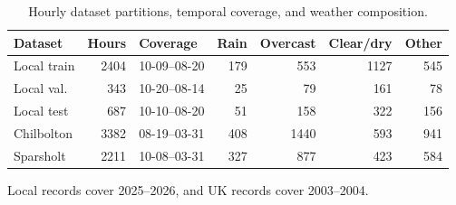 \begin{table}[!htbp]
\centering
\caption{Hourly dataset partitions, temporal coverage, and weather composition.}
\label{tab:Table02_Dataset_Overview}
\small
\setlength{\tabcolsep}{1.5pt} %
\renewcommand{\arraystretch}{1.12}
\begin{tabular}{@{}lrlrrrr@{}} %
\toprule
Dataset & Hours & Coverage & Rain & Overcast & Clear/dry & Other \\
\midrule
Local train & 2404 & 10-09--08-20 & 179 & 553 & 1127 & 545 \\
Local val.  & 343  & 10-20--08-14 & 25  & 79  & 161  & 78  \\
Local test  & 687  & 10-10--08-20 & 51  & 158 & 322  & 156 \\
Chilbolton  & 3382 & 08-19--03-31 & 408 & 1440 & 593 & 941 \\
Sparsholt   & 2211 & 10-08--03-31 & 327 & 877 & 423  & 584 \\
\bottomrule
\end{tabular}
\par\smallskip
{\footnotesize Local records cover 2025--2026, and UK records cover 2003--2004.\par}
\end{table}
